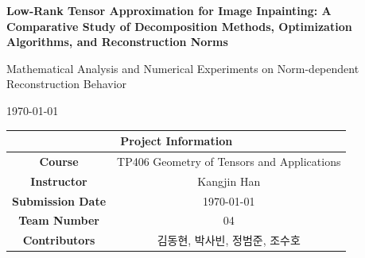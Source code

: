 \begin{titlepage}
  \thispagestyle{empty}
  
  \begin{center}

    \vspace*{3cm}

    {\LARGE\bfseries
      Low-Rank Tensor Approximation for Image Inpainting: A Comparative Study of Decomposition Methods, Optimization Algorithms, and Reconstruction Norms
    }

    \vspace{1.2em}

    {\large
      Mathematical Analysis and Numerical Experiments on Norm-dependent Reconstruction Behavior
    }

    \vspace{3cm}

    {\large \today}

    \vfill
    
    \begin{table}[h]
      \centering
      \renewcommand{\arraystretch}{1.5} %
      \begin{tabular}{|c || c|}
        \hline \hline
        \multicolumn{2}{|c|}{\textbf{Project Information}} \\ \hline \hline
        \textbf{Course}       & TP406 Geometry of Tensors and Applications \\ \hline
        \textbf{Instructor}   & Kangjin Han \\ \hline
        \textbf{Submission Date} & \today \\ \hline
        \textbf{Team Number} & 04 \\ \hline
        \textbf{Contributors} & 김동현, 박사빈, 정범준, 조수호 \\ \hline \hline
      \end{tabular}
    \end{table}
    
    \vspace{1cm} %

  \end{center}
\end{titlepage}